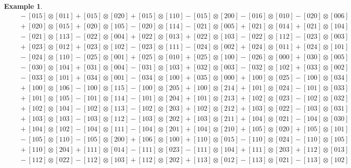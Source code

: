 \documentclass{amsart}
\theoremstyle{definition}
\newtheorem{example}[lemma]{Example}
\theoremstyle{remark}
\numberwithin{equation}{subsection}
\begin{document}
\begin{example}
\begin{align*}
&\quad - [015] \otimes [011] + [015] \otimes [020] + [015] \otimes [110] - [015] \otimes [200] - [016] \otimes [010] - [020] \otimes [006] \\
&\quad + [020] \otimes [015] + [020] \otimes [105] - [020] \otimes [114] - [021] \otimes [005] + [021] \otimes [014] + [021] \otimes [104] \\
&\quad - [021] \otimes [113] - [022] \otimes [004] + [022] \otimes [013] + [022] \otimes [103] - [022] \otimes [112] - [023] \otimes [003] \\
&\quad + [023] \otimes [012] + [023] \otimes [102] - [023] \otimes [111] - [024] \otimes [002] + [024] \otimes [011] + [024] \otimes [101] \\
&\quad - [024] \otimes [110] - [025] \otimes [001] + [025] \otimes [010] + [025] \otimes [100] - [026] \otimes [000] + [030] \otimes [005] \\
&\quad - [030] \otimes [104] + [031] \otimes [004] - [031] \otimes [103] + [032] \otimes [003] - [032] \otimes [102] + [033] \otimes [002] \\
&\quad - [033] \otimes [101] + [034] \otimes [001] - [034] \otimes [100] + [035] \otimes [000] + [100] \otimes [025] - [100] \otimes [034] \\
&\quad + [100] \otimes [106] - [100] \otimes [115] - [100] \otimes [205] + [100] \otimes [214] + [101] \otimes [024] - [101] \otimes [033] \\
&\quad + [101] \otimes [105] - [101] \otimes [114] - [101] \otimes [204] + [101] \otimes [213] + [102] \otimes [023] - [102] \otimes [032] \\
&\quad + [102] \otimes [104] - [102] \otimes [113] - [102] \otimes [203] + [102] \otimes [212] + [103] \otimes [022] - [103] \otimes [031] \\
&\quad + [103] \otimes [103] - [103] \otimes [112] - [103] \otimes [202] + [103] \otimes [211] + [104] \otimes [021] - [104] \otimes [030] \\
&\quad + [104] \otimes [102] - [104] \otimes [111] - [104] \otimes [201] + [104] \otimes [210] + [105] \otimes [020] + [105] \otimes [101] \\
&\quad - [105] \otimes [110] - [105] \otimes [200] + [106] \otimes [100] + [110] \otimes [015] - [110] \otimes [024] - [110] \otimes [105] \\
&\quad + [110] \otimes [204] + [111] \otimes [014] - [111] \otimes [023] - [111] \otimes [104] + [111] \otimes [203] + [112] \otimes [013] \\
&\quad - [112] \otimes [022] - [112] \otimes [103] + [112] \otimes [202] + [113] \otimes [012] - [113] \otimes [021] - [113] \otimes [102] \\

\end{align*}
\end{example}
\end{document}
